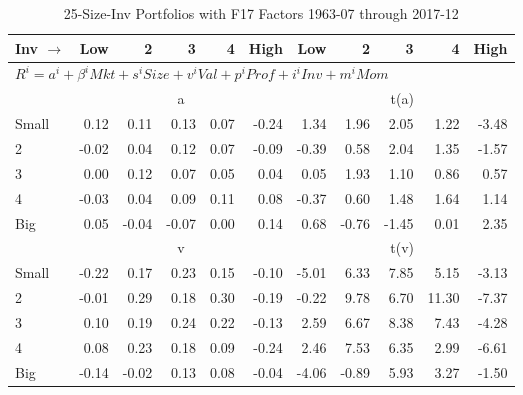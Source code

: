 
\begin{table}[!ht]
\footnotesize
\centering
\caption{25-Size-Inv Portfolios with F17 Factors 1963-07 through 2017-12}
\begin{tabular}{lrrrrrrrrrr}
  \toprule
    Inv $\rightarrow$ & Low & 2 & 3 & 4 & High & Low & 2 & 3 & 4 & High \\ 
  \midrule
  \multicolumn{11}{l}{$R^i=a^i+\beta^iMkt+s^iSize+v^iVal+p^iProf+i^iInv+m^iMom$} \\

  
    
      & \multicolumn{5}{c}{a} & \multicolumn{5}{c}{t(a)}
    
    \\
      \cmidrule(r){2-6} \cmidrule(r){7-11}

    Small   & 0.12  & 0.11  & 0.13  & 0.07  & -0.24  & 1.34  & 1.96  & 2.05  & 1.22  & -3.48  \\
         2  & -0.02  & 0.04  & 0.12  & 0.07  & -0.09  & -0.39  & 0.58  & 2.04  & 1.35  & -1.57  \\
         3  & 0.00  & 0.12  & 0.07  & 0.05  & 0.04  & 0.05  & 1.93  & 1.10  & 0.86  & 0.57  \\
         4  & -0.03  & 0.04  & 0.09  & 0.11  & 0.08  & -0.37  & 0.60  & 1.48  & 1.64  & 1.14  \\
    Big     & 0.05  & -0.04  & -0.07  & 0.00  & 0.14  & 0.68  & -0.76  & -1.45  & 0.01  & 2.35  \\

  
    
      & \multicolumn{5}{c}{v} & \multicolumn{5}{c}{t(v)}
    
    \\
      \cmidrule(r){2-6} \cmidrule(r){7-11}

    Small   & -0.22  & 0.17  & 0.23  & 0.15  & -0.10  & -5.01  & 6.33  & 7.85  & 5.15  & -3.13  \\
         2  & -0.01  & 0.29  & 0.18  & 0.30  & -0.19  & -0.22  & 9.78  & 6.70  & 11.30  & -7.37  \\
         3  & 0.10  & 0.19  & 0.24  & 0.22  & -0.13  & 2.59  & 6.67  & 8.38  & 7.43  & -4.28  \\
         4  & 0.08  & 0.23  & 0.18  & 0.09  & -0.24  & 2.46  & 7.53  & 6.35  & 2.99  & -6.61  \\
    Big     & -0.14  & -0.02  & 0.13  & 0.08  & -0.04  & -4.06  & -0.89  & 5.93  & 3.27  & -1.50  \\

  
    

\end{tabular}
\end{table}
